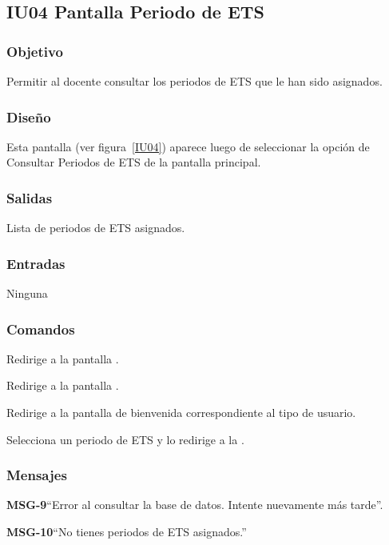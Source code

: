 \subsection{IU04 Pantalla Periodo de ETS}

\subsubsection{Objetivo}
	Permitir al docente consultar los periodos de ETS que le han sido asignados. 

\subsubsection{Diseño}
	Esta pantalla  (ver figura~\ref{IU04}) aparece luego de seleccionar la opción de Consultar Periodos de ETS de la pantalla principal. 


\subsubsection{Salidas}

	Lista de periodos de ETS asignados. 

\subsubsection{Entradas}
Ninguna

\subsubsection{Comandos}

\begin{Citemize}
	\item {} Redirige a la pantalla .
	\item {} Redirige a la pantalla .
	\item {} Redirige a la pantalla de bienvenida correspondiente al tipo de usuario.
	\item {} Selecciona un periodo de ETS y lo redirige a la . 
\end{Citemize}


\subsubsection{Mensajes}

\begin{Citemize}
	\item {\bf MSG-9}{``Error al consultar la base de datos. Intente nuevamente más tarde''.}
	\item {\bf MSG-10}{``No tienes periodos de ETS asignados.''}
\end{Citemize}

